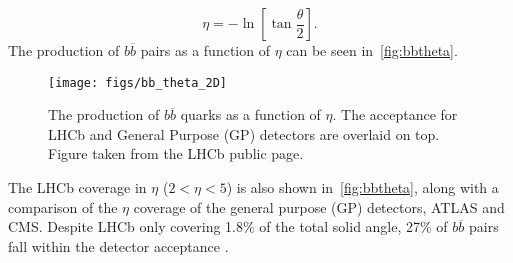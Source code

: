 \begin{equation}
  \eta = -\ln[\tan\frac{\theta}{2}].
\end{equation}
The production of $b\overline{b}$ pairs as a function of $\eta$ can be seen in~\autoref{fig:bbtheta}.
\begin{figure}[!h]
  \centering
  \texttt{[image: figs/bb\_theta\_2D]}
  \caption{The production of $b\overline{b}$ quarks as a function of $\eta$. The acceptance for LHCb and General Purpose (\Gls{GP}) detectors are overlaid on top. Figure taken from the LHCb public page.}
\label{fig:bbtheta}    
\end{figure}
The LHCb coverage in $\eta$ ($2<\eta<5$) is also shown in~\autoref{fig:bbtheta}, along with a comparison of the $\eta$ coverage of the general purpose (GP) detectors, ATLAS and CMS. %
Despite LHCb only covering 1.8\% of the total solid angle, 27\% of $b\overline{b}$ pairs fall within the detector acceptance \cite{LHCb-DP-2014-001}. 


